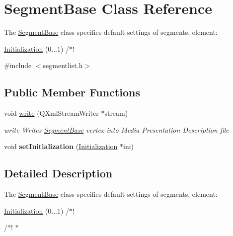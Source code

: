 \hypertarget{class_segment_base}{\section{Segment\-Base Class Reference}
\label{class_segment_base}
}


The \hyperlink{class_segment_base}{Segment\-Base} class specifies default settings of segments. element\-:
\begin{DoxyEnumerate}
\item \hyperlink{class_initialization}{Initialization} (0...1) /$\ast$! 
\end{DoxyEnumerate} 




{\ttfamily \#include $<$segmentlist.\-h$>$}

\subsection*{Public Member Functions}
\begin{DoxyCompactItemize}
\item 
void \hyperlink{class_segment_base_a62a316d412de52dab7564e104afe53d0}{write} (Q\-Xml\-Stream\-Writer $\ast$stream)
\begin{DoxyCompactList}\small\item\em write Writes \hyperlink{class_segment_base}{Segment\-Base} vertex into Media Presentation Description file \end{DoxyCompactList}\item 
\hypertarget{class_segment_base_a1e22fe04146793fb5f47ed6f92fe7bc0}{void {\bfseries set\-Initialization} (\hyperlink{class_initialization}{Initialization} $\ast$ini)}\label{class_segment_base_a1e22fe04146793fb5f47ed6f92fe7bc0}

\end{DoxyCompactItemize}


\subsection{Detailed Description}
The \hyperlink{class_segment_base}{Segment\-Base} class specifies default settings of segments. element\-:
\begin{DoxyEnumerate}
\item \hyperlink{class_initialization}{Initialization} (0...1) /$\ast$! 
\end{DoxyEnumerate}

/$\ast$! $\ast$ 

